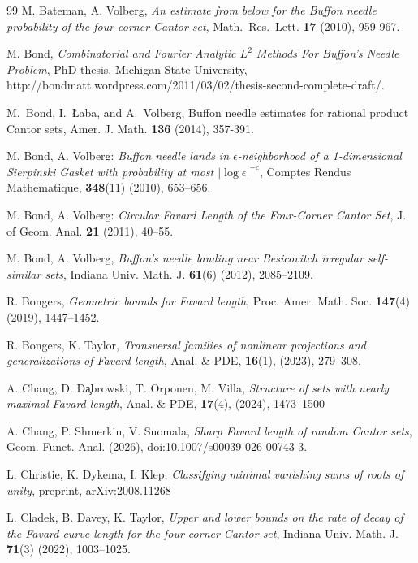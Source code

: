 \documentclass[12pt]{amsart}
\numberwithin{equation}{section}
\begin{document}
\newpage

\begin{thebibliography}{99}
 M. Bateman, A. Volberg, {\it An estimate from below for the Buffon 
needle probability of the four-corner Cantor set}, Math.\ Res.\ Lett. {\bf 17} (2010), 959-967.


M. Bond, {\it Combinatorial and Fourier Analytic $L^2$ Methods For Buffon's Needle Problem}, PhD thesis, Michigan State University, http://bondmatt.wordpress.com/2011/03/02/thesis-second-complete-draft/.

 M.\ Bond, I.\ {\L}aba, and A.\ Volberg, Buffon needle estimates for rational product Cantor sets, Amer. J. Math. {\bf 136} (2014), 357-391.


M. Bond, A. Volberg: {\it Buffon needle lands in $\epsilon$-neighborhood of a 1-dimensional 
Sierpinski Gasket with probability at most $|\log\epsilon|^{-c}$}, Comptes Rendus Mathematique, {\bf 348}(11) (2010), 653--656.

M. Bond, A. Volberg: {\it Circular Favard Length of the Four-Corner Cantor Set}, J. of Geom. Anal. {\bf 21} (2011), 40--55.

M. Bond, A. Volberg, {\it Buffon's needle landing near Besicovitch irregular self-similar sets},
Indiana Univ. Math. J. {\bf 61}(6) (2012), 2085--2109.

 R. Bongers, {\it Geometric bounds for Favard length}, Proc. Amer. Math. Soc. {\bf 147}(4) (2019), 1447--1452.

 R. Bongers, K. Taylor, {\it Transversal families of nonlinear projections and generalizations of Favard length}, Anal. \& PDE, {\bf 16}(1), (2023), 279--308.

 A. Chang, D. D\c{a}browski, T. Orponen, M. Villa, \textit{Structure of sets with nearly maximal Favard length}, Anal. \& PDE, {\bf 17}(4), (2024), 1473--1500

 A. Chang, P. Shmerkin, V. Suomala, \textit{Sharp Favard length of random Cantor sets}, Geom. Funct. Anal. (2026), doi:10.1007/s00039-026-00743-3.

 L. Christie, K. Dykema, I. Klep, {\it Classifying minimal vanishing sums of roots of unity}, preprint, arXiv:2008.11268

 L. Cladek, B. Davey, K. Taylor, \textit{Upper and lower bounds on the rate of decay of the Favard curve length for the four-corner Cantor set}, Indiana Univ. Math. J. {\bf 71}(3) (2022), 1003--1025.


\end{thebibliography}
\end{document}

